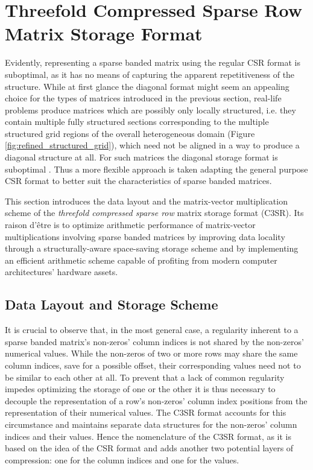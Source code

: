\chapter{Threefold Compressed Sparse Row Matrix Storage Format}

  Evidently, representing a sparse banded matrix using the regular CSR format is suboptimal, as it has no means of
  capturing the apparent repetitiveness of the structure. While at first glance the diagonal format might seem an
  appealing choice for the types of matrices introduced in the previous section, real-life problems produce matrices
  which are possibly only locally structured, i.e. they contain multiple fully structured sections corresponding to the
  multiple structured grid regions of the overall heterogeneous domain (Figure \ref{fig:refined_structured_grid}), which
  need not be aligned in a way to produce a diagonal structure at all. For such matrices the diagonal storage format is
  suboptimal \cite{Bell2011}. Thus a more flexible approach is taken adapting the general purpose CSR format to better
  suit the characteristics of sparse banded matrices.

  This section introduces the data layout and the matrix-vector multiplication scheme of the \emph{threefold compressed
  sparse row} matrix storage format (C3SR). Its raison d'être is to optimize arithmetic performance of matrix-vector
  multiplications involving sparse banded matrices by improving data locality through a structurally-aware space-saving
  storage scheme and by implementing an efficient arithmetic scheme capable of profiting from modern computer
  architectures' hardware assets.

  \section{Data Layout and Storage Scheme}

    It is crucial to observe that, in the most general case, a regularity inherent to a sparse banded matrix's
    non-zeros' column indices is not shared by the non-zeros' numerical values. While the non-zeros of two or more rows
    may share the same column indices, save for a possible offset, their corresponding values need not to be similar to
    each other at all. To prevent that a lack of common regularity impedes optimizing the storage of one or the other it
    is thus necessary to decouple the representation of a row's non-zeros' column index positions from the
    representation of their numerical values. The C3SR format accounts for this circumstance and maintains separate data
    structures for the non-zeros' column indices and their values. Hence the nomenclature of the C3SR format, as it is
    based on the idea of the CSR format and adds another two potential layers of compression: one for the column indices
    and one for the values.

